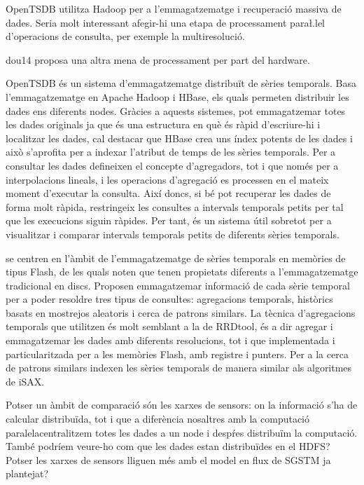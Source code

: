 



OpenTSDB utilitza Hadoop per a l'emmagatzematge i recuperació massiva de dades. Seria molt interessant afegir-hi una etapa de processament para\l.lel d'operacions de consulta, per exemple la multiresolució.

dou14 proposa una altra mena de processament per part del hardware.




OpenTSDB \parencite{opentsdb} és un sistema
  d'emmagatzematge distribuït de sèries temporals. Basa
  l'emmagatzematge en Apache Hadoop i HBase, els quals permeten
  distribuir les dades ens diferents nodes. Gràcies a aquests
  sistemes, pot emmagatzemar totes les dades originals ja que és una
  estructura en què és ràpid d'escriure-hi i localitzar les dades, cal
  destacar que HBase crea uns índex potents de les dades i això
  s'aprofita per a indexar l'atribut de temps de les sèries temporals.
  Per a consultar les dades defineixen el concepte d'agregadors, tot i
  que només per a interpolacions lineals, i les operacions d'agregació
  es processen en el mateix moment d'executar la consulta.  Així
  doncs, si bé pot recuperar les dades de forma molt ràpida,
  restringeix les consultes a intervals temporals petits per tal que
  les execucions siguin ràpides. Per tant, és un sistema útil sobretot
  per a visualitzar i comparar intervals temporals petits de diferents
  sèries temporals.






 \textcite{dou14:historic_queries_flash_storage} se centren en
  l'àmbit de l'emmagatzematge de sèries temporals en memòries de tipus
  Flash, de les quals noten que tenen propietats diferents a
  l'emmagatzematge tradicional en discs.  Proposen emmagatzemar
  informació de cada sèrie temporal per a poder resoldre tres tipus de
  consultes: agregacions temporals, històrics basats en mostrejos
  aleatoris i cerca de patrons similars.  La tècnica d'agregacions
  temporals que utilitzen és molt semblant a la de RRDtool, és a dir
  agregar i emmagatzemar les dades amb diferents resolucions, tot i
  que implementada i particularitzada per a les memòries Flash, amb
  registre i punters. Per a la cerca de patrons similars indexen les
  sèries temporals de manera similar als algoritmes de iSAX.






Potser un àmbit de comparació són les xarxes de sensors: on la informació s'ha de calcular distribuïda, tot i que a diferència nosaltres amb la computació paralelacentralitzem totes les dades a un node i despŕes distribuïm la computació. També podríem veure-ho com que les dades estan distribuïdes en el HDFS?
Potser les xarxes de sensors lliguen més amb el model en flux de SGSTM ja plantejat?



